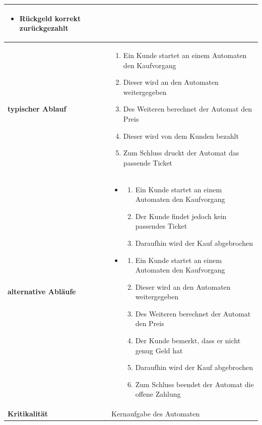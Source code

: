 \documentclass{article}
\begin{document}
\begin{tabularx}{\textwidth}{|l|X|}
\begin{itemize}
            \item Rückgeld korrekt zurückgezahlt
        \end{itemize} \\\hline
        \textbf{typischer Ablauf} & \begin{enumerate}
            \item Ein \gls{Kunde} startet an einem Automaten den Kaufvorgang
            \item Dieser wird an den Automaten weitergegeben
            \item Des Weiteren berechnet der Automat den Preis
            \item Dieser wird von dem \gls{Kunden} bezahlt
            \item Zum Schluss druckt der Automat das passende \gls{Ticket}
        \end{enumerate} \\\hline
        \textbf{alternative Abläufe} & \begin{itemize}
            \item \begin{enumerate}
                \item Ein \gls{Kunde} startet an einem Automaten den Kaufvorgang
                \item Der \gls{Kunde} findet jedoch kein passendes \gls{Ticket}
                \item Daraufhin wird der Kauf abgebrochen
            \end{enumerate}
            \item \begin{enumerate}
                \item Ein \gls{Kunde} startet an einem Automaten den Kaufvorgang
                \item Dieser wird an den Automaten weitergegeben
                \item Des Weiteren berechnet der Automat den Preis
                \item Der \gls{Kunde} bemerkt, dass er nicht genug Geld hat
                \item Daraufhin wird der Kauf abgebrochen
                \item Zum Schluss beendet der Automat die offene Zahlung
            \end{enumerate}
        \end{itemize} \\\hline
        \textbf{Kritikalität} & \gls{Kernaufgabe} des Automaten \\\hline

\end{tabularx}
\end{document}

